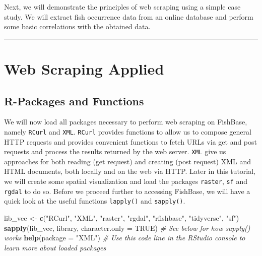 \documentclass[
]{book}
\newenvironment{Shaded}{\begin{snugshade}}{\end{snugshade}}
\newcommand{\CommentTok}[1]{\textcolor[rgb]{0.56,0.35,0.01}{\textit{#1}}}
\newcommand{\DataTypeTok}[1]{\textcolor[rgb]{0.13,0.29,0.53}{#1}}
\newcommand{\KeywordTok}[1]{\textcolor[rgb]{0.13,0.29,0.53}{\textbf{#1}}}
\newcommand{\NormalTok}[1]{#1}
\newcommand{\OtherTok}[1]{\textcolor[rgb]{0.56,0.35,0.01}{#1}}
\newcommand{\StringTok}[1]{\textcolor[rgb]{0.31,0.60,0.02}{#1}}
\begin{document}
Next, we will demonstrate the principles of web scraping using a simple case study. We will extract fish occurrence data from an online database and perform some basic correlations with the obtained data.

\begin{center}\rule{0.5\linewidth}{0.5pt}\end{center}

\hypertarget{web-scraping-applied}{%
\section{Web Scraping Applied}\label{web-scraping-applied}}

\hypertarget{r-packages-and-functions}{%
\subsection{R-Packages and Functions}\label{r-packages-and-functions}}

We will now load all packages necessary to perform web scraping on FishBase, namely \texttt{RCurl} and \texttt{XML}. \texttt{RCurl} provides functions to allow us to compose general HTTP requests and provides convenient functions to fetch URLs via get and post requests and process the results returned by the web server.
\texttt{XML} give us approaches for both reading (get request) and creating (post request) XML and HTML documents, both locally and on the web via HTTP. Later in this tutorial, we will create some spatial visualization and load the packages \texttt{raster}, \texttt{sf} and \texttt{rgdal} to do so. Before we proceed further to accessing FishBase, we will have a quick look at the useful functions \texttt{lapply()} and \texttt{sapply()}.

\begin{Shaded}
\begin{Highlighting}[]
\NormalTok{lib_vec <-}\StringTok{ }\KeywordTok{c}\NormalTok{(}\StringTok{"RCurl"}\NormalTok{, }\StringTok{"XML"}\NormalTok{, }\StringTok{"raster"}\NormalTok{, }\StringTok{"rgdal"}\NormalTok{, }\StringTok{"rfishbase"}\NormalTok{, }\StringTok{"tidyverse"}\NormalTok{, }\StringTok{"sf"}\NormalTok{)}
\KeywordTok{sapply}\NormalTok{(lib_vec, library, }\DataTypeTok{character.only =} \OtherTok{TRUE}\NormalTok{) }\CommentTok{# See below for how sapply() works}
\KeywordTok{help}\NormalTok{(}\DataTypeTok{package =} \StringTok{"XML"}\NormalTok{) }\CommentTok{# Use this code line in the RStudio console to learn more about loaded packages}
\end{Highlighting}
\end{Shaded}
\end{document}
